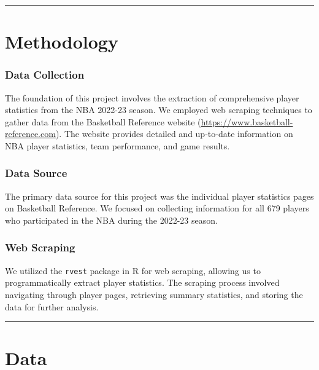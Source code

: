 \documentclass[
]{article}
\begin{document}
\begin{center}\rule{0.5\linewidth}{0.5pt}\end{center}

\hypertarget{methodology}{%
\section{Methodology}\label{methodology}}

\hypertarget{data-collection}{%
\subsubsection{Data Collection}\label{data-collection}}

The foundation of this project involves the extraction of comprehensive
player statistics from the NBA 2022-23 season. We employed web scraping
techniques to gather data from the Basketball Reference website
(\url{https://www.basketball-reference.com}). The website provides
detailed and up-to-date information on NBA player statistics, team
performance, and game results.

\hypertarget{data-source}{%
\subsubsection{Data Source}\label{data-source}}

The primary data source for this project was the individual player
statistics pages on Basketball Reference. We focused on collecting
information for all 679 players who participated in the NBA during the
2022-23 season.

\hypertarget{web-scraping}{%
\subsubsection{Web Scraping}\label{web-scraping}}

We utilized the \texttt{rvest} package in R for web scraping, allowing
us to programmatically extract player statistics. The scraping process
involved navigating through player pages, retrieving summary statistics,
and storing the data for further analysis.

\begin{center}\rule{0.5\linewidth}{0.5pt}\end{center}

\hypertarget{data}{%
\section{Data}\label{data}}
\end{document}
